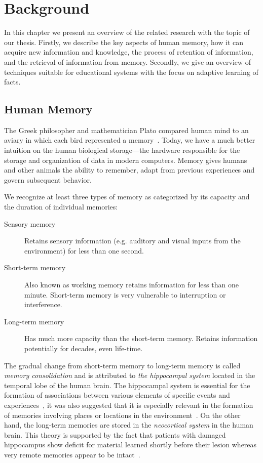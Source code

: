 \chapter{Background}

In this chapter we present an overview of the related research with the topic of our thesis. Firstly, we describe the key aspects of human memory, how it can acquire new information and knowledge, the process of retention of information, and the retrieval of information from memory. Secondly, we give an overview of techniques suitable for educational systems with the focus on adaptive learning of facts.

\section{Human Memory}

The Greek philosopher and mathematician Plato compared human mind to an aviary in which each bird represented a memory~\cite{MichaelW.Eysenck2008}. Today, we have a much better intuition on the human biological storage---the hardware responsible for the storage and organization of data in modern computers. Memory gives humans and other animals the ability to remember, adapt from previous experiences and govern subsequent behavior.

We recognize at least three types of memory as categorized by its capacity and the duration of individual memories:

\begin{description}
  \item [Sensory memory] Retains sensory information (e.g. auditory and visual inputs from the environment) for less than one second.
  \item [Short-term memory] Also known as working memory retains information for less than one minute. Short-term memory is very vulnerable to interruption or interference.
  \item [Long-term memory] Has much more capacity than the short-term memory. Retains information potentially for decades, even life-time.
\end{description}

The gradual change from short-term memory to long-term memory is called \textit{memory consolidation} and is attributed to \textit{the hippocampal system} located in the temporal lobe of the human brain. The hippocampal system is essential for the formation of associations between various elements of specific events and experiences~\cite{mcclelland1995there}, it was also suggested that it is especially relevant in the formation of memories involving places or locations in the environment~\cite{o1978hippocampus}. On the other hand, the long-term memories are stored in the \textit{neocortical system} in the human brain. This theory is supported by the fact that patients with damaged hippocampus show deficit for material learned shortly before their lesion whereas very remote memories appear to be intact~\cite{mcclelland1995there}.

